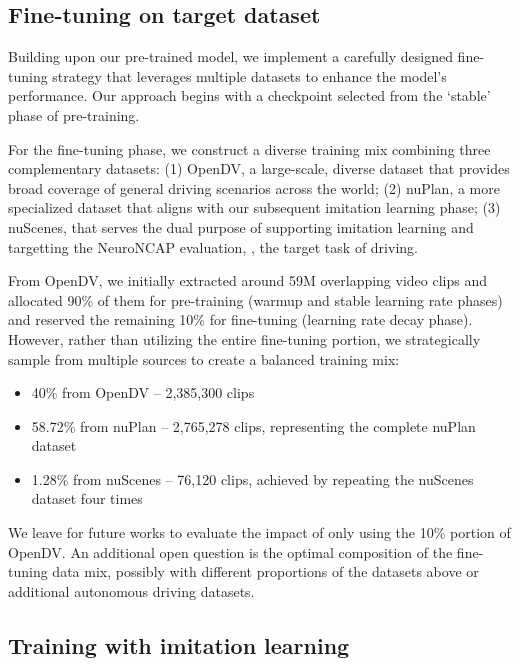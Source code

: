 \subsection{Fine-tuning \vm{} on target dataset}
\label{subsec:finetuning}

Building upon our pre-trained model, we implement a carefully designed fine-tuning strategy that leverages multiple datasets to enhance the model's performance. Our approach begins with a checkpoint selected from the `stable' phase of pre-training.

For the fine-tuning phase, we construct a diverse training mix combining three complementary datasets: (1) OpenDV, a large-scale, diverse dataset that provides broad coverage of general driving scenarios across the world; (2) nuPlan, a more specialized dataset that aligns with our subsequent imitation learning phase; (3) nuScenes, that serves the dual purpose of supporting imitation learning and targetting the NeuroNCAP evaluation, \ie, the target task of driving. 

From OpenDV, we initially extracted around 59M overlapping video clips and allocated 90\% of them for pre-training (warmup and stable learning rate phases) and reserved the remaining 10\% for fine-tuning (learning rate decay phase). However, rather than utilizing the entire fine-tuning portion, we strategically sample from multiple sources to create a balanced training mix:

\begin{itemize}[leftmargin=1cm]
    \setlength{\itemsep}{0.5em}
    \item 40\% from OpenDV -- 2,385,300 clips
    \item 58.72\% from nuPlan -- 2,765,278 clips, representing the complete nuPlan dataset
    \item 1.28\% from nuScenes -- 76,120 clips, achieved by repeating the nuScenes dataset four times
\end{itemize}

We leave for future works to evaluate the impact of only using the 10\% portion of OpenDV. An additional open question is the optimal composition of the fine-tuning data mix, possibly with different proportions of the datasets above or additional autonomous driving datasets.

\subsection{Training \vam{} with imitation learning}
\label{sec:imitationlearning}

